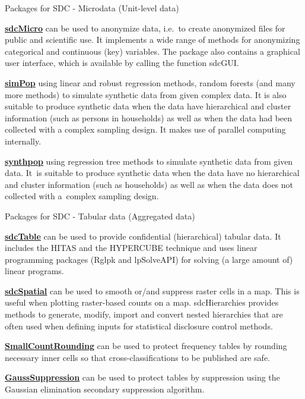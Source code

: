 \documentclass[
	aspectratio = 169
 ]{beamer}
\begin{document}
\begin{frame}{Packages for SDC - Microdata (Unit-level data)}

\href{https://cran.r-project.org/web/packages/sdcMicro/index.html}{\color{blue}\underline{\textbf{sdcMicro}}}
can be used to anonymize data, i.e.~to create anonymized files for
public and scientific use. It implements a wide range of methods for
anonymizing categorical and continuous (key) variables. The package also
contains a graphical user interface, which is available by calling the
function sdcGUI.

\href{https://cran.r-project.org/web/packages/simPop/index.html}{\color{blue}\underline{\textbf{simPop}}}
using linear and robust regression methods, random forests (and many
more methods) to simulate synthetic data from given complex data. It is
also suitable to produce synthetic data when the data have hierarchical
and cluster information (such as persons in households) as well as when
the data had been collected with a complex sampling design. It makes use
of parallel computing internally.

\href{https://cran.r-project.org/web/packages/synthpop/index.html}{\color{blue}\underline{\textbf{synthpop}}}
using regression tree methods to simulate synthetic data from given
data. It~is suitable to produce synthetic data when the data have no
hierarchical and cluster information (such as households) as well as
when the data does not collected with a~complex sampling design.
\end{frame}

\begin{frame}{Packages for SDC - Tabular data (Aggregated data)}

\href{https://cran.r-project.org/web/packages/sdcTable/index.html}{\color{blue}\underline{\textbf{sdcTable}}}
can be used to provide confidential (hierarchical) tabular data. It
includes the HITAS and the HYPERCUBE technique and uses linear
programming packages (Rglpk and lpSolveAPI) for solving (a large amount
of) linear programs.

\href{https://cran.r-project.org/web/packages/sdcSpatial/index.html}{\color{blue}\underline{\textbf{sdcSpatial}}}
can be used to smooth or/and suppress raster cells in a map. This is
useful when plotting raster-based counts on a map. sdcHierarchies
provides methods to generate, modify, import and convert nested
hierarchies that are often used when defining inputs for statistical
disclosure control methods.

\href{https://cran.r-project.org/web/packages/SmallCountRounding/index.html}{\color{blue}\underline{\textbf{SmallCountRounding}}}
can be used to protect frequency tables by rounding necessary inner
cells so that cross-classifications to be published are safe.

\href{https://cran.r-project.org/web/packages/GaussSuppression/index.html}{\color{blue}\underline{\textbf{GaussSuppression}}}
can be used to protect tables by suppression using the Gaussian
elimination secondary suppression algorithm.
\end{frame}
\end{document}
